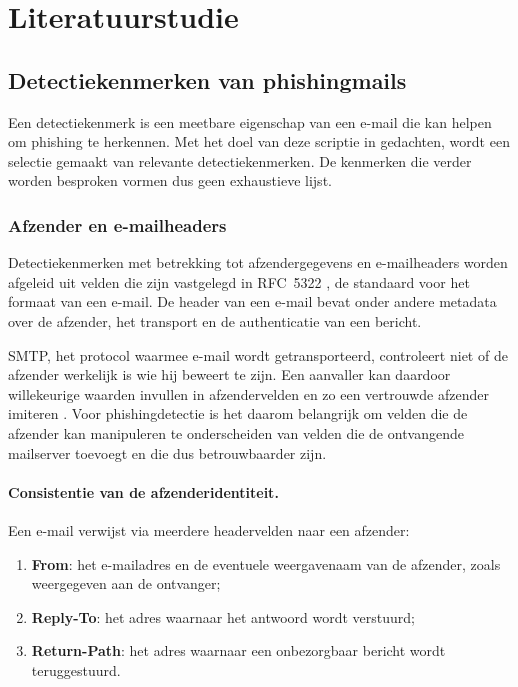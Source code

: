 \section{Literatuurstudie}%
\label{sec:literatuurstudie}

\subsection{Detectiekenmerken van phishingmails}
\label{subsec:kenmerken-detectie}

Een detectiekenmerk is een meetbare eigenschap van een e-mail die kan helpen om phishing te herkennen. Met het doel van deze scriptie in gedachten, wordt een selectie gemaakt van relevante detectiekenmerken. De kenmerken die verder worden besproken vormen dus geen exhaustieve lijst.

\subsubsection{Afzender en e-mail\-headers}
\label{subsubsec:Afzender en e-mailheaders}

Detectiekenmerken met betrekking tot afzendergegevens en e-mailheaders worden afgeleid uit velden die zijn vastgelegd in RFC~5322 \autocite{Resnick2008}, de standaard voor het formaat van een e-mail. De header van een e-mail bevat onder andere metadata over de afzender, het transport en de authenticatie van een bericht. 

SMTP, het protocol waarmee e-mail wordt getransporteerd, controleert niet of de afzender werkelijk is wie hij beweert te zijn. Een aanvaller kan daardoor willekeurige waarden invullen in afzendervelden en zo een vertrouwde afzender imiteren \autocite{Hu2018}. Voor phishingdetectie is het daarom belangrijk om velden die de afzender kan manipuleren te onderscheiden van velden die de ontvangende mailserver toevoegt en die dus betrouwbaarder zijn.

\paragraph{Consistentie van de afzenderidentiteit.}
Een e-mail verwijst via meerdere headervelden naar een afzender: 
\begin{enumerate}
    \item \textbf{From}: het e-mailadres en de eventuele weergavenaam van de afzender, zoals weergegeven aan de ontvanger;
    \item \textbf{Reply-To}: het adres waarnaar het antwoord wordt verstuurd;
    \item \textbf{Return-Path}: het adres waarnaar een onbezorgbaar bericht wordt teruggestuurd. 
\end{enumerate}

